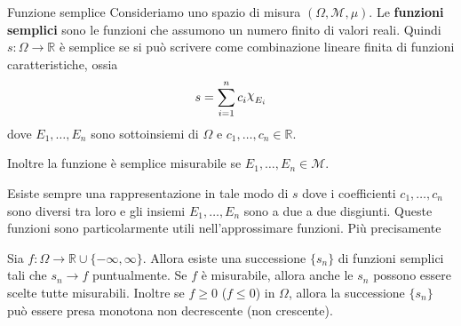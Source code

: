 \begin{definition}{Funzione semplice}
Consideriamo uno spazio di misura \((\Omega, \mathcal{M}, \mu)\). Le
\textbf{funzioni semplici}
sono le funzioni che assumono un numero finito di valori reali. Quindi
\(s : \Omega \to  \mathbb{R}\) è semplice se si può scrivere come combinazione
lineare finita di funzioni caratteristiche, ossia
\[
    s = \sum_{i=1}^{n} c_{i} \rchi_{E_{i}}
\]
dove \(E_{1}, \dots, E_{n}\) sono sottoinsiemi di \(\Omega\) e \(c_{1}, \dots,
c_{n} \in \mathbb{R}\).

Inoltre la funzione è semplice misurabile se \(E_{1}, \dots, E_{n} \in
\mathcal{M}\).
\end{definition}
Esiste sempre una rappresentazione in tale modo di \(s\) dove i coefficienti
\(c_{1}, \dots, c_{n}\) sono diversi tra loro e gli insiemi \(E_{1}, \dots,
E_{n}\) sono a due a due disgiunti. Queste funzioni sono particolarmente utili
nell'approssimare funzioni. Più precisamente
\begin{proposition}\label{prop:esistenza_semplici}
    Sia \(f : \Omega \to  \mathbb{R} \cup \{-\infty, \infty\} \). Allora esiste
    una successione \(\{s_{n}\} \) di funzioni semplici tali che \(s_{n} \to f\)
    puntualmente. Se \(f\) è misurabile, allora anche le \(s_{n}\) possono
    essere scelte tutte misurabili. Inoltre se \(f \ge 0\) (\(f \le 0\)) in \(\Omega\), allora
    la successione \(\{s_{n}\} \) può essere presa monotona non decrescente (non
    crescente).
\end{proposition}
